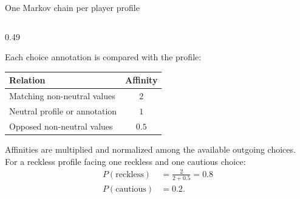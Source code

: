 \documentclass{beamer}
\begin{document}
\begin{frame}{One Markov chain per player profile}
\begin{columns}[T,onlytextwidth]
\begin{column}{0.49\textwidth}
				{\scriptsize
					Each choice annotation is compared with the profile:
					\vspace{-0.3cm}
					\begin{center}
						\begin{tabular}{lc}
							\hline
							\textbf{Relation} & \textbf{Affinity} \\
							\hline
							Matching non-neutral values & $2$ \\
							Neutral profile or annotation & $1$ \\
							Opposed non-neutral values & $0.5$ \\
							\hline
						\end{tabular}
					\end{center}
					
					Affinities are multiplied and normalized among the
					available outgoing choices. \\
					\vspace*{0.1cm}
					For a reckless profile facing one reckless and one cautious choice:
					\begin{align*}
						P(\mathrm{reckless})&=\tfrac{2}{2+0.5}=0.8 \\
						P(\mathrm{cautious})&=0.2.
					\end{align*}
				}
			\end{column}
			
		\end{columns}
		
	\end{frame}
	
	
\end{document}
